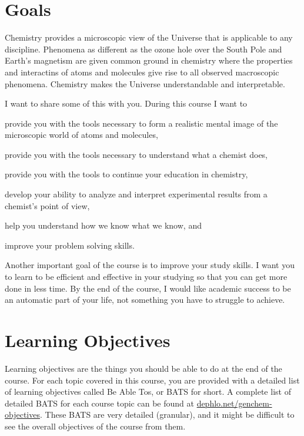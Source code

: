 \documentclass[letterpaper,oneside,onecolumn,11pt,article]{memoir}
\begin{document}
\section{Goals}
Chemistry provides a microscopic view of the Universe that is applicable to any discipline. Phenomena as different as the ozone hole over the South Pole and Earth's magnetism are given common ground in chemistry where the properties and interactins of atoms and molecules give rise to all observed macroscopic phenomena. Chemistry makes the Universe understandable and interpretable. 

I want to share some of this with you. During this course I want to 
\begin{inparaenum}
\item provide you with the tools necessary to form a realistic mental image of the microscopic world of atoms and molecules,
\item provide you with the tools necessary to understand what a chemist does,
\item provide you with the tools to continue your education in chemistry,
\item develop your ability to analyze and interpret experimental results from a chemist's point of view,
\item help you understand how we know what we know, and
\item improve your problem solving skills.
\end{inparaenum}

Another important goal of the course is to improve your study skills. I want you to learn to be efficient and effective in your studying so that you can get more done in less time. By the end of the course, I would like academic success to be an automatic part of your life, not something you have to struggle to achieve. 
%
%
\section{Learning Objectives}
Learning objectives are the things you should be able to do at the end of the course. For each topic covered in this course, you are provided with a detailed list of learning objectives called Be Able Tos, or BATS for short. A complete list of detailed BATS for each course topic can be found at \href{http://dephlo.net/chem110/lecture/objectives}{dephlo.net/genchem-objectives}. These BATS are very detailed (granular), and it might be difficult to see the overall objectives of the course from them. 
\end{document}
